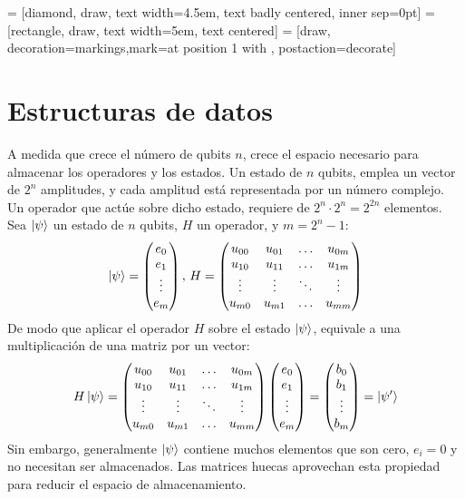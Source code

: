 \begin{center}
 = [diamond, draw, text width=4.5em, text badly centered, 
inner sep=0pt]
 = [rectangle, draw, text width=5em, text centered]
 = [draw, decoration={markings,mark=at position 
1 with {}}, postaction={decorate}]
%
\end{center}

\section{Estructuras de datos}
A medida que crece el número de qubits $n$, crece el espacio necesario para 
almacenar los operadores y los estados.
Un estado de $n$ qubits, emplea un vector de $2^{n}$ amplitudes, y cada amplitud 
está representada por un número complejo.  Un operador que actúe sobre dicho 
estado, requiere de $2^{n} \cdot 2^{n} = 2^{2n}$ elementos.  Sea $\ket{\psi}$ un 
estado de $n$ qubits, $H$ un operador, y $m = 2^{n}-1$:
%
$$ \ket{\psi} = \begin{pmatrix} e_0 \\ e_1 \\ \vdots \\ e_m \end{pmatrix},\, H =
	\begin{pmatrix}  u_{00} & u_{01} & \ldots & u_{0m} \\
		u_{10} & u_{11} & \ldots & u_{1m}\\
		\vdots & \vdots & \ddots & \vdots \\
		u_{m0} & u_{m1} & \ldots & u_{mm}\\
	 \end{pmatrix}
$$
%
De modo que aplicar el operador $H$ sobre el estado $\ket{\psi}$, equivale a una 
multiplicación de una matriz por un vector:
%
$$ H \ket{\psi} = \begin{pmatrix}  u_{00} & u_{01} & \ldots & u_{0m} \\
		u_{10} & u_{11} & \ldots & u_{1m}\\
		\vdots & \vdots & \ddots & \vdots \\
		u_{m0} & u_{m1} & \ldots & u_{mm}\\
	 \end{pmatrix}
	\begin{pmatrix} e_0 \\ e_1 \\ \vdots \\ e_m \end{pmatrix}
=
	\begin{pmatrix} b_0 \\ b_1 \\ \vdots \\ b_m \end{pmatrix} = \ket{\psi'}
$$
%
Sin embargo, generalmente $\ket{\psi}$ contiene muchos elementos que son cero, 
$e_i = 0$ y no necesitan ser almacenados. Las matrices huecas aprovechan esta 
propiedad para reducir el espacio de almacenamiento.

